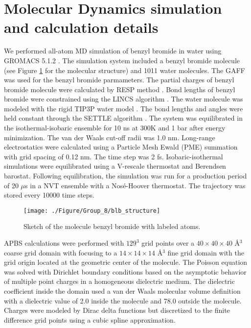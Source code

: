 \section{Molecular Dynamics simulation and calculation details}
\label{app:sim}
We performed all-atom \ac{MD} simulation of benzyl bromide in water using GROMACS 5.1.2 \cite{GROMACS}.
The simulation system included a benzyl bromide molecule (see Figure \ref{fig:mol_blb} for the molecular structure) 
 and 1011 water molecules.
The \ac{GAFF} \cite{RN1} was used for the benzyl bromide parmameters.
The partial charges of benzyl bromide molecule were calculated by RESP method \cite{RN2}.
Bond lengths of benzyl bromide were constrained using the LINCS algorithm \cite{RN3}.
The water molecule was modeled with the rigid TIP3P water model \cite{RN4}.
The bond lengths and angles were held constant through the SETTLE algorithm \cite{RN5}.
The system was equilibrated in the isothermal-isobaric ensemble for 10 ns at 300K and 1 bar after energy minimization.
The van der Waals cut-off radii was 1.0 nm.
Long-range electrostatics were calculated using a Particle Mesh Ewald (PME) summation with grid spacing of 0.12 nm.
The time step was 2 fs.
Isobaric-isothermal simulations were equilibrated using a V-rescale thermostat and Berendsen barostat.
Following equilibration, the simulation was run for a production period of 20 $\mu$s in a NVT ensemble with a Nos\'e-Hoover thermostat.
The trajectory was stored every 10000 time steps.

\begin{figure}[htbp]
\center
\texttt{[image: ./Figure/Group\_8/blb\_structure]}
\caption{Sketch of the molecule benzyl bromide with labeled atoms.}
\label{fig:mol_blb}
\end{figure}


APBS calculations \cite{BakerSJHM01, APBS_2018} were performed with $129^3$ grid points over a $40 \times 40 \times 40$ \AA$^3$ coarse grid domain with focusing to a $14 \times 14 \times 14$ \AA$^3$ fine grid domain with the grid origin located at the geometric center of the molecule.
The Poisson equation was solved with Dirichlet boundary conditions based on the asymptotic behavior of multiple point charges in a homogeneous dielectric medium.
The dielectric coefficient inside the domain used a van der Waals molecular volume definition with a dielectric value of 2.0 inside the molecule and 78.0 outside the molecule.
Charges were modeled by Dirac delta functions but discretized to the finite difference grid points using a cubic spline approximation.

